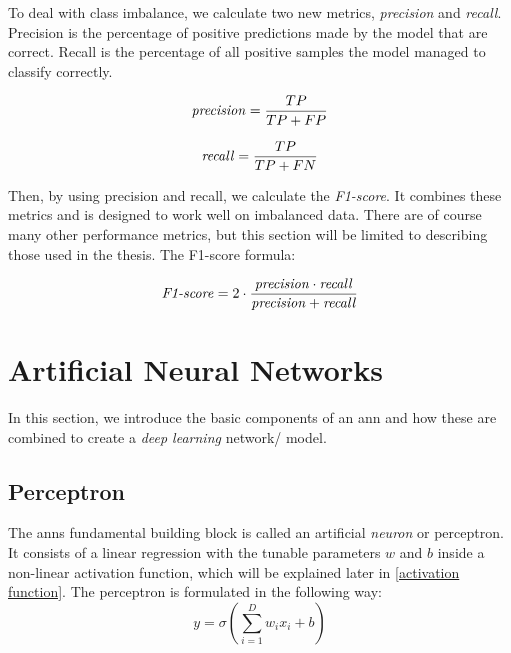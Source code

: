         To deal with class imbalance, we calculate two new metrics, \textit{precision} and \textit{recall}\cite{powers2020evaluation_f1_recall_precision}. Precision is the percentage of positive predictions made by the model that are correct. Recall is the percentage of all positive samples the model managed to classify correctly.
        
        \begin{equation}
            \textrm{\textit{precision}} = \dfrac{TP}{TP+FP}
        \end{equation}
        
        \begin{equation}
            \textrm{\textit{recall}} = \dfrac{TP}{TP+FN}
        \end{equation}
        
        Then, by using precision and recall, we calculate the \textit{F1-score}\cite{powers2020evaluation_f1_recall_precision}. It combines these metrics and is designed to work well on imbalanced data. There are of course many other performance metrics, but this section will be limited to describing those used in the thesis. The F1-score formula:
        
        \begin{equation}
            \textrm{\textit{F1-score}} = 2 \cdot \dfrac{\textrm{\textit{precision}} \cdot \textrm{\textit{recall}}}{\textrm{\textit{precision}} + \textrm{\textit{recall}}}
        \end{equation}
        

\section{Artificial Neural Networks} \label{neural networks}
    In this section, we introduce the basic components of an \gls{ann} and how these are combined to create a \textit{deep learning} network/ model. 

    \subsection{Perceptron} \label{perceptron}
        The \gls{ann}s fundamental building block is called an artificial \textit{neuron} or perceptron. It consists of a linear regression with the tunable parameters $w$ and $b$ inside a non-linear activation function, which will be explained later in \ref{activation function}. The perceptron is formulated in the following way\cite{razavi2021deep_exp_per}:
            \begin{equation} \label{eq_perceptron}
                y = \sigma(\sum_{i=1}^{D}w_ix_i + b)
            \end{equation}
            
